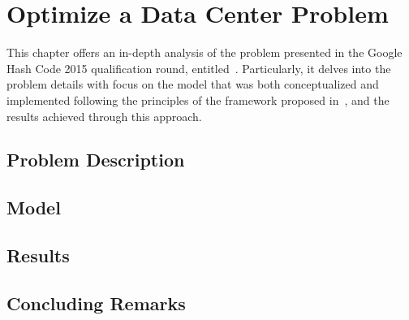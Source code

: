 \chapter{Optimize a Data Center Problem}
\label{ch:optimize-data-center}


This chapter offers an in-depth analysis of the problem presented in the Google
Hash Code 2015 qualification round,
entitled~. Particularly, it
delves into the problem details with focus on the model that was both
conceptualized and implemented following the principles of the framework
proposed in~, and the results achieved
through this approach.

\section{Problem Description}
\label{sec:odc-problem}


\section{Model}
\label{sec:odc-model}


\section{Results}
\label{sec:odc-results}


\section{Concluding Remarks}
\label{sec:odc-concluding-remarks}
